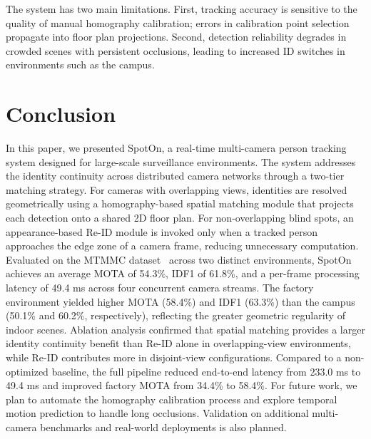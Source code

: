 \documentclass[conference]{IEEEtran}
\begin{document}
The system has two main limitations. First, tracking accuracy is sensitive to the quality of manual homography calibration; errors in calibration point selection propagate into floor plan projections. Second, detection reliability degrades in crowded scenes with persistent occlusions, leading to increased ID switches in environments such as the campus.

\section{Conclusion}
\label{sec:conclusion}

In this paper, we presented SpotOn, a real-time multi-camera person tracking system designed for large-scale surveillance environments. The system addresses the identity continuity across distributed camera networks through a two-tier matching strategy. For cameras with overlapping views, identities are resolved geometrically using a homography-based spatial matching module that projects each detection onto a shared 2D floor plan. For non-overlapping blind spots, an appearance-based Re-ID module is invoked only when a tracked person approaches the edge zone of a camera frame, reducing unnecessary computation. Evaluated on the MTMMC dataset~\cite{mtmmc} across two distinct environments, SpotOn achieves an average MOTA of 54.3\%, IDF1 of 61.8\%, and a per-frame processing latency of 49.4 ms across four concurrent camera streams. The factory environment yielded higher MOTA (58.4\%) and IDF1 (63.3\%) than the campus (50.1\% and 60.2\%, respectively), reflecting the greater geometric regularity of indoor scenes. Ablation analysis confirmed that spatial matching provides a larger identity continuity benefit than Re-ID alone in overlapping-view environments, while Re-ID contributes more in disjoint-view configurations. Compared to a non-optimized baseline, the full pipeline reduced end-to-end latency from 233.0 ms to 49.4 ms and improved factory MOTA from 34.4\% to 58.4\%. For future work, we plan to automate the homography calibration process and explore temporal motion prediction to handle long occlusions. Validation on additional multi-camera benchmarks and real-world deployments is also planned.


\end{document}
